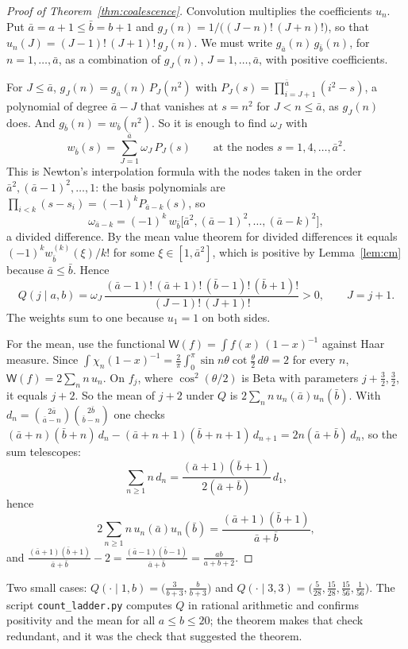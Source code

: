 \begin{proof}[Proof of Theorem~\ref{thm:coalescence}]
Convolution multiplies the coefficients $u_n$. Put $\bar a=a+1\le \bar b=b+1$ and $g_J(n)=1/\big((J-n)!\,(J+n)!\big)$, so that $u_n(J)=(J-1)!\,(J+1)!\,g_J(n)$. We must write $g_{\bar a}(n)\,g_{\bar b}(n)$, for $n=1,\dots,\bar a$, as a combination of $g_J(n)$, $J=1,\dots,\bar a$, with positive coefficients.

For $J\le \bar a$, $g_J(n)=g_{\bar a}(n)\,P_J(n^2)$ with $P_J(s)=\prod_{i=J+1}^{\bar a}(i^2-s)$, a polynomial of degree $\bar a-J$ that vanishes at $s=n^2$ for $J<n\le \bar a$, as $g_J(n)$ does. And $g_{\bar b}(n)=w_{\bar b}(n^2)$. So it is enough to find $\omega_J$ with
\[
w_{\bar b}(s)=\sum_{J=1}^{\bar a}\omega_J\,P_J(s)\qquad\text{at the nodes }s=1,4,\dots,\bar a^2 .
\]
This is Newton's interpolation formula with the nodes taken in the order $\bar a^2,(\bar a-1)^2,\dots,1$: the basis polynomials are $\prod_{i<k}(s-s_i)=(-1)^kP_{\bar a-k}(s)$, so
\[
\omega_{\bar a-k}=(-1)^k\,w_{\bar b}\big[\bar a^2,(\bar a-1)^2,\dots,(\bar a-k)^2\big],
\]
a divided difference. By the mean value theorem for divided differences it equals $(-1)^kw_{\bar b}^{(k)}(\xi)/k!$ for some $\xi\in[1,\bar a^2]$, which is positive by Lemma~\ref{lem:cm} because $\bar a\le \bar b$. Hence
\[
Q(j\mid a,b)=\omega_J\,\frac{(\bar a-1)!\,(\bar a+1)!\,(\bar b-1)!\,(\bar b+1)!}{(J-1)!\,(J+1)!}>0,\qquad J=j+1 .
\]
The weights sum to one because $u_1=1$ on both sides.

For the mean, use the functional $\mathsf W(f)=\int f(x)\,(1-x)^{-1}$ against Haar measure. Since $\int\chi_n(1-x)^{-1}=\frac2\pi\int_0^\pi\sin n\theta\cot\frac\theta2\,d\theta=2$ for every $n$, $\mathsf W(f)=2\sum_nn\,u_n$. On $f_j$, where $\cos^2(\theta/2)$ is Beta with parameters $j+\frac32,\frac32$, it equals $j+2$. So the mean of $j+2$ under $Q$ is $2\sum_nn\,u_n(\bar a)u_n(\bar b)$. With $d_n=\binom{2\bar a}{\bar a-n}\binom{2\bar b}{\bar b-n}$ one checks $(\bar a+n)(\bar b+n)\,d_n-(\bar a+n+1)(\bar b+n+1)\,d_{n+1}=2n(\bar a+\bar b)\,d_n$, so the sum telescopes:
\[
\sum_{n\ge1}n\,d_n=\frac{(\bar a+1)(\bar b+1)}{2(\bar a+\bar b)}\,d_1,
\]
hence
\[
2\sum_{n\ge1}n\,u_n(\bar a)u_n(\bar b)=\frac{(\bar a+1)(\bar b+1)}{\bar a+\bar b},
\]
and $\frac{(\bar a+1)(\bar b+1)}{\bar a+\bar b}-2=\frac{(\bar a-1)(\bar b-1)}{\bar a+\bar b}=\frac{ab}{a+b+2}$.
\end{proof}

Two small cases: $Q(\cdot\mid1,b)=\big(\frac3{b+3},\frac b{b+3}\big)$ and $Q(\cdot\mid3,3)=\big(\frac5{28},\frac{15}{28},\frac{15}{56},\frac1{56}\big)$. The script \texttt{count\_ladder.py} computes $Q$ in rational arithmetic and confirms positivity and the mean for all $a\le b\le20$; the theorem makes that check redundant, and it was the check that suggested the theorem.


